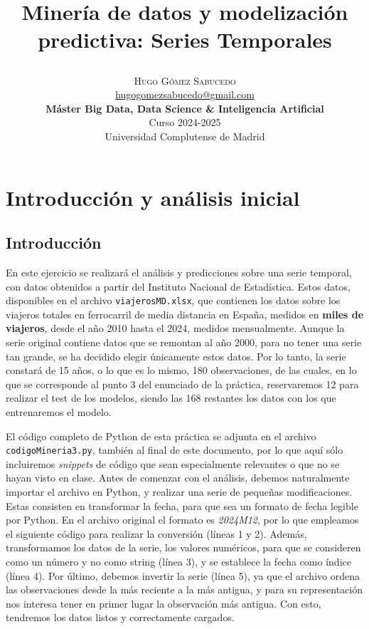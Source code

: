 \documentclass[a4paper,onecolumn]{extarticle}
\title{\begin{center} \Huge Minería de datos y modelización predictiva: Series Temporales\end{center}} %
\author{
    \textsc{\Huge Hugo Gómez Sabucedo} \\ %
    \large \href{mailto:hugogomezsabucedo@gmail.com}{hugogomezsabucedo@gmail.com} \\ [2ex] %
    \Large \textbf{Máster Big Data, Data Science \& Inteligencia Artificial} \\
    \normalsize Curso 2024-2025 \\
    \large Universidad Complutense de Madrid
}
\date{} %
\let\stdsection\section
\renewcommand\section{\newpage\stdsection}
\begin{document}
\maketitle
\tableofcontents
\begin{sloppypar}


\section{Introducción y análisis inicial} \label{introduccion}
\subsection{Introducción} \label{intro}
En este ejercicio se realizará el análisis y predicciones sobre una serie temporal, con datos obtenidos a partir del Instituto Nacional de Estadística. Estos 
datos, disponibles en el archivo \texttt{viajerosMD.xlsx}, que contienen los datos sobre los viajeros totales en ferrocarril de media distancia en España, 
medidos en \textbf{miles de viajeros}, desde el año 2010 hasta el 2024, medidos mensualmente. Aunque la serie original contiene datos que se remontan al año 2000, 
para no tener una serie tan grande, se ha decidido elegir únicamente estos datos. Por lo tanto, la serie constará de 15 años, o lo que es lo mismo, 180 
observaciones, de las cuales, en lo que se corresponde al punto 3 del enunciado de la práctica, reservaremos 12 para realizar el test de los modelos, siendo 
las 168 restantes los datos con los que entrenaremos el modelo.

El código completo de Python de esta práctica se adjunta en el archivo \texttt{codigoMineria3.py}, también al final de este documento, por lo que aquí sólo 
incluiremos \textit{snippets} de código que sean especialmente relevantes o que no se hayan visto en clase. Antes de comenzar con el análisis, debemos 
naturalmente importar el archivo en Python, y realizar una serie de pequeñas modificaciones. Estas consisten en transformar la fecha, para que sea un formato 
de fecha legible por Python. En el archivo original el formato es \textit{    2024M12}, por lo que empleamos el siguiente código para realizar la conversión 
(líneas 1 y 2). Además, transformamos los datos de la serie, los valores numéricos, para que se consideren como un número y no como string (línea 3), y se 
establece la fecha como índice (línea 4). Por último, debemos invertir la serie (línea 5), ya que el archivo ordena las observaciones desde la más reciente a 
la más antigua, y para su representación nos interesa tener en primer lugar la observación más antigua. Con esto, tendremos los datos listos y correctamente cargados.


\end{sloppypar}
\end{document}

